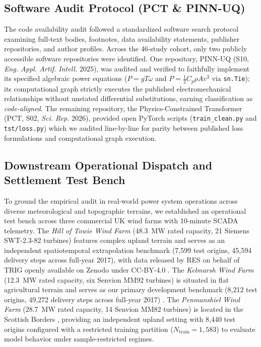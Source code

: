 \subsection{Software Audit Protocol (PCT \& PINN-UQ)}
The code availability audit followed a standardized software search protocol examining full-text bodies, footnotes, data availability statements, publisher repositories, and author profiles. Across the 46-study cohort, only two publicly accessible software repositories were identified. One repository, PINN-UQ (S10, \textit{Eng. Appl. Artif. Intell.} 2025), was audited and verified to faithfully implement its specified algebraic power equations ($P = g T \omega$ and $P = \frac{1}{2} C_p \rho A v^3$ via \texttt{sn.Tie}); its computational graph strictly executes the published electromechanical relationships without unstated differential substitutions, earning classification as \textit{code-aligned}. The remaining repository, the Physics-Constrained Transformer (PCT, S02, \textit{Sci. Rep.} 2026), provided open PyTorch scripts (\texttt{train\_clean.py} and \texttt{tst/loss.py}) which we audited line-by-line for parity between published loss formulations and computational graph execution.

\subsection{Downstream Operational Dispatch and Settlement Test Bench}
To ground the empirical audit in real-world power system operations across diverse meteorological and topographic terrains, we established an operational test bench across three commercial UK wind farms with 10-minute SCADA telemetry. The \textit{Hill of Towie Wind Farm} (48.3~MW rated capacity, 21 Siemens SWT-2.3-82 turbines) features complex upland terrain and serves as an independent spatiotemporal extrapolation benchmark (7,599 test origins, 45,594 delivery steps across full-year 2017), with data released by RES on behalf of TRIG openly available on Zenodo under CC-BY-4.0 \cite{zenodo_hilloftowie}. The \textit{Kelmarsh Wind Farm} (12.3~MW rated capacity, six Senvion MM92 turbines) is situated in flat agricultural terrain and serves as our primary development benchmark (8,212 test origins, 49,272 delivery steps across full-year 2017) \cite{zenodo_kelmarsh}. The \textit{Penmanshiel Wind Farm} (28.7~MW rated capacity, 14 Senvion MM82 turbines) is located in the Scottish Borders \cite{zenodo_penmanshiel}, providing an independent upland setting with 8,440 test origins configured with a restricted training partition ($N_{\text{train}} = 1,583$) to evaluate model behavior under sample-restricted regimes.

